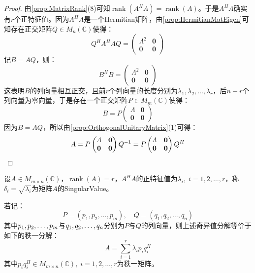\begin{proof}
	由\cref{prop:MatrixRank}(8)可知$\operatorname{rank}(A^HA)=\operatorname{rank}(A)$。于是$A^HA$确实有$r$个正特征值。因为$A^HA$是一个Hermitian矩阵，由\cref{prop:HermitianMatEigen}可知存在正交矩阵$Q\in M_{n}(\mathbb{C})$使得：
	\begin{equation*}
		Q^HA^HAQ=
		\begin{pmatrix}
			\varLambda^2 & \mathbf{0} \\
			\mathbf{0} & \mathbf{0}
		\end{pmatrix}
	\end{equation*}
	记$B=AQ$，则：
	\begin{equation*}
		B^HB=
		\begin{pmatrix}
			\varLambda^2 & \mathbf{0} \\
			\mathbf{0} & \mathbf{0}
		\end{pmatrix}
	\end{equation*}
	这表明$B$的列向量相互正交，且前$r$个列向量的长度分别为$\lambda_1,\lambda_2,\dots,\lambda_r$，后$n-r$个列向量为零向量，于是存在一个正交矩阵$P\in M_{m}(\mathbb{C})$使得：
	\begin{equation*}
		B=P
		\begin{pmatrix}
			\varLambda & \mathbf{0} \\
			\mathbf{0} & \mathbf{0}
		\end{pmatrix}
	\end{equation*}
	因为$B=AQ$，所以由\cref{prop:OrthogonalUnitaryMatrix}(1)可得：
	\begin{equation*}
		A=P
		\begin{pmatrix}
			\varLambda & \mathbf{0} \\
			\mathbf{0} & \mathbf{0}
		\end{pmatrix}Q^{-1}
		=P
		\begin{pmatrix}
			\varLambda & \mathbf{0} \\
			\mathbf{0} & \mathbf{0}
		\end{pmatrix}Q^H\qedhere
	\end{equation*}
\end{proof}
\begin{definition}
	设$A\in M_{m\times n}(\mathbb{C})$，$\operatorname{rank}(A)=r$，$A^HA$的正特征值为$\lambda_i,\;i=1,2,\dots,r$，称$\delta_i=\sqrt{\lambda_i}$为矩阵$A$的\gls{SingularValue}。
\end{definition}
\begin{note}
	若记：
	\begin{equation*}
		P=(p_1,p_2,\dots,p_m),\quad Q=(q_1,q_2,\dots,q_n)
	\end{equation*}
	其中$p_1, p_2, \dots, p_{m}$与$q_1, q_2, \dots, q_{n}$分别为$P$与$Q$的列向量，则上述奇异值分解等价于如下的秩一分解：
	\begin{equation*}
		A=\sum_{i=1}^r\lambda_ip_iq_i^H
	\end{equation*}
	其中$p_iq_i^H\in M_{m\times n}(\mathbb{C}),\;i=1,2,\dots,r$为秩一矩阵。
\end{note}
